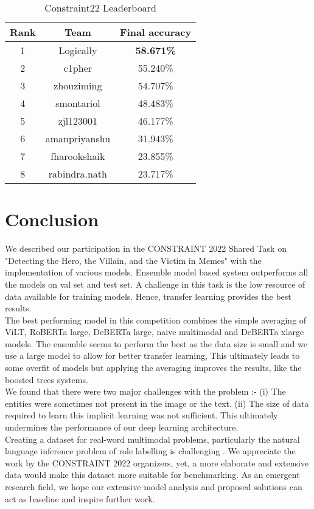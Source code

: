 \documentclass[11pt]{article}
\begin{document}
\begin{table} 
\centering
\begin{tabular}{ |c||c||c|    }
 \hline
 \textbf{Rank} & \textbf{Team}  & \textbf{Final accuracy}\\
 \hline
 1 & Logically & \textbf{58.671\%} \\
 \hline
2 & {c1pher}       & 55.240\% \\
\hline
3 & {zhouziming} & 54.707\% \\
\hline
4 & {smontariol} & 48.483\% \\
\hline
5 & {zjl123001} & 46.177\% \\
\hline
6 & {amanpriyanshu}& 31.943\% \\
\hline
7 & {fharookshaik} & 23.855\% \\
\hline
8 & {rabindra.nath} & 23.717\% \\
 \hline
\end{tabular}
\caption{Constraint22 Leaderboard}
 \label{tab:factify_leaderboard}
\end{table}

\section{Conclusion}
\label{sec:bibtex}
We described our participation in the CONSTRAINT 2022 Shared Task on "Detecting the Hero, the Villain, and the Victim in Memes" with the implementation of various models. Ensemble model based system outperforms all the models on val set and test set. A challenge in this task is the low resource of data available for training models. Hence, transfer learning provides the best results.\\
The best performing model in this competition combines the simple averaging of ViLT, RoBERTa large, DeBERTa large, naive multimodal and DeBERTa xlarge models. The ensemble seems to perform the best as the data size is small and we  use a large model to allow for better transfer learning, This ultimately leads to some overfit of models but applying the averaging improves the results, like the boosted trees systems. \\

We found that there were two major challenges with the problem :- (i) The entities were sometimes not present in the image or the text. (ii) The size of data required to learn this implicit learning was not sufficient. This  ultimately undermines the performance of our deep learning architecture.\\ Creating a dataset for real-word multimodal problems, particularly the natural language inference problem of role labelling is challenging \cite{le2020adversarial}. We appreciate the work by the CONSTRAINT 2022 organizers, yet, a more elaborate and extensive data would make this dataset more suitable for benchmarking. As an emergent research field, we hope our extensive model analysis and proposed solutions can act as baseline and inspire further work.
\end{document}
